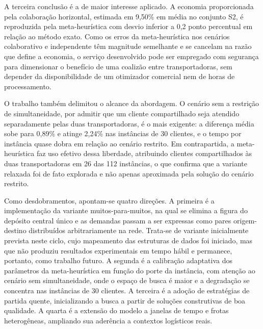 \documentclass[a4paper,12pt]{article}
\begin{document}
A terceira conclusão é a de maior interesse aplicado. A economia proporcionada pela colaboração horizontal, estimada em 9,50\% em média no conjunto S2, é reproduzida pela meta-heurística com desvio inferior a 0,2 ponto percentual em relação ao método exato. Como os erros da meta-heurística nos cenários colaborativo e independente têm magnitude semelhante e se cancelam na razão que define a economia, o serviço desenvolvido pode ser empregado com segurança para dimensionar o benefício de uma coalizão entre transportadoras, sem depender da disponibilidade de um otimizador comercial nem de horas de processamento.

O trabalho também delimitou o alcance da abordagem. O cenário sem a restrição de simultaneidade, por admitir que um cliente compartilhado seja atendido separadamente pelas duas transportadoras, é o mais exigente: a diferença média sobe para 0,89\% e atinge 2,24\% nas instâncias de 30 clientes, e o tempo por instância quase dobra em relação ao cenário restrito. Em contrapartida, a meta-heurística faz uso efetivo dessa liberdade, atribuindo clientes compartilhados às duas transportadoras em 26 das 112 instâncias, o que confirma que a variante relaxada foi de fato explorada e não apenas aproximada pela solução do cenário restrito.

Como desdobramentos, apontam-se quatro direções. A primeira é a implementação da variante muitos-para-muitos, na qual se elimina a figura do depósito central único e as demandas passam a ser expressas como pares origem-destino distribuídos arbitrariamente na rede. Trata-se de variante inicialmente prevista neste ciclo, cujo mapeamento das estruturas de dados foi iniciado, mas que não produziu resultados experimentais em tempo hábil e permanece, portanto, como trabalho futuro. A segunda é a calibração adaptativa dos parâmetros da meta-heurística em função do porte da instância, com atenção ao cenário sem simultaneidade, onde o espaço de busca é maior e a degradação se concentra nas instâncias de 30 clientes. A terceira é a adoção de estratégias de partida quente, inicializando a busca a partir de soluções construtivas de boa qualidade. A quarta é a extensão do modelo a janelas de tempo e frotas heterogêneas, ampliando sua aderência a contextos logísticos reais.
\end{document}
